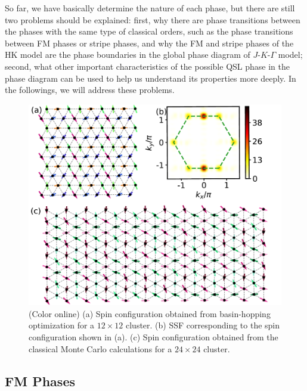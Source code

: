 \documentclass[aps,prb,reprint,amsfonts,amsmath,amssymb,showpacs,groupedaddress,superscriptaddress]{revtex4-1}
\begin{document}
So far, we have basically determine the nature of each phase, but there are still two problems should be explained: first, why there are phase transitions between the phases with the same type of classical orders, such as the phase transitions between FM phases or stripe phases, and why the FM and stripe phases of the HK model are the phase boundaries in the global phase diagram of $J$-$K$-$\Gamma$ model; second, what other important characteristics of the possible QSL phase in the phase diagram can be used to help us understand its properties more deeply. In the followings, we will address these problems.

\begin{figure}
    \centering
    \includegraphics[width=0.95\columnwidth]{fig/ModulatedStripe.pdf}
    \caption{\label{fig:ModulatedStripe}(Color online) (a) Spin configuration obtained from basin-hopping optimization for a $12 \times 12$ cluster. (b) SSF corresponding to the spin configuration shown in (a). (c) Spin configuration obtained from the classical Monte Carlo calculations for a $24 \times 24$ cluster.}
\end{figure}

\subsection{\label{subsec:FMPhases}FM Phases}
\end{document}
